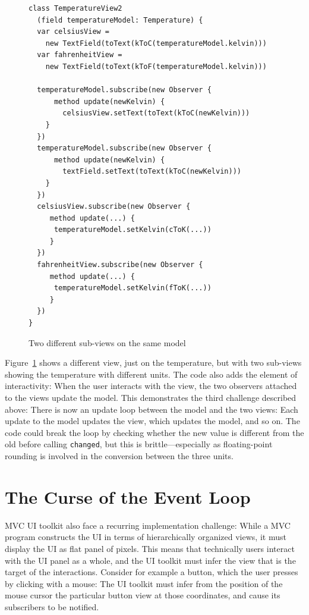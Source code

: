 \documentclass[sigplan,screen]{acmart}
\begin{document}
\begin{figure}[tb]
\begin{verbatim}
class TemperatureView2
  (field temperatureModel: Temperature) {
  var celsiusView =
    new TextField(toText(kToC(temperatureModel.kelvin)))
  var fahrenheitView =
    new TextField(toText(kToF(temperatureModel.kelvin)))

  temperatureModel.subscribe(new Observer {
      method update(newKelvin) {
        celsiusView.setText(toText(kToC(newKelvin)))
    }
  })
  temperatureModel.subscribe(new Observer {
      method update(newKelvin) {
        textField.setText(toText(kToC(newKelvin)))
    }
  })
  celsiusView.subscribe(new Observer {
     method update(...) {
      temperatureModel.setKelvin(cToK(...))
     }
  })
  fahrenheitView.subscribe(new Observer {
     method update(...) {
      temperatureModel.setKelvin(fToK(...))
     }
  })
}
\end{verbatim}
  \caption{Two different sub-views on the same model}
  \label{fig:temperature-view2}
\end{figure}
%
Figure~\ref{fig:temperature-view2} shows a different view, just on the
temperature, but with two sub-views showing the temperature with
different units.  The code also adds the element of interactivity:
When the user interacts with the view, the two observers attached to
the views update the model.  This demonstrates the third challenge
described above: There is now an update loop between the model and
the two views: Each update to the model updates the view, which
updates the model, and so on.  The code could break the loop by
checking whether the new value is different from the old before
calling \texttt{changed}, but this is brittle---especially as
floating-point rounding is involved in the conversion between the
three units.

\section{The Curse of the Event Loop}
\label{sec:event-loop}

MVC UI toolkit also face a recurring implementation challenge: While a
MVC program constructs the UI in terms of hierarchically organized
views, it must display the UI as flat panel of pixels.  This means
that technically users interact with the UI panel as a whole, and the
UI toolkit must infer the view that is the target of the interactions.
Consider for example a button, which the user presses by clicking with
a mouse: The UI toolkit must infer from the position of the mouse
cursor the particular button view at those coordinates, and cause its
subscribers to be notified.
\end{document}
